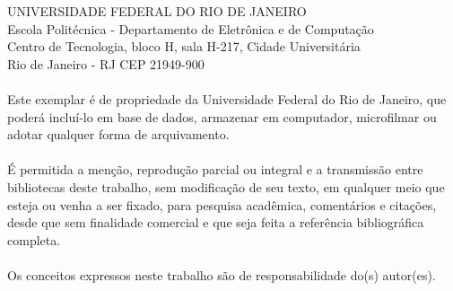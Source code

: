 \pagebreak

      \vspace{0.5cm}

UNIVERSIDADE FEDERAL DO RIO DE JANEIRO \\
Escola Politécnica - Departamento de Eletrônica e de Computação \\
Centro de Tecnologia, bloco H, sala H-217, Cidade Universitária \\ 
Rio de Janeiro - RJ      CEP 21949-900\\
\vspace{0.5cm}
\paragraph{}Este exemplar é de propriedade da Universidade Federal do Rio de Janeiro, que poderá incluí-lo em base de dados, armazenar em computador, microfilmar ou adotar qualquer forma de arquivamento.
\paragraph{}É permitida a menção, reprodução parcial ou integral e a transmissão entre bibliotecas deste trabalho, sem modificação de seu texto, em qualquer meio que esteja ou venha a ser fixado, para pesquisa acadêmica, comentários e citações, desde que sem finalidade comercial e que seja feita a referência bibliográfica completa.
\paragraph{}Os conceitos expressos neste trabalho são de responsabilidade do(s) autor(es).

